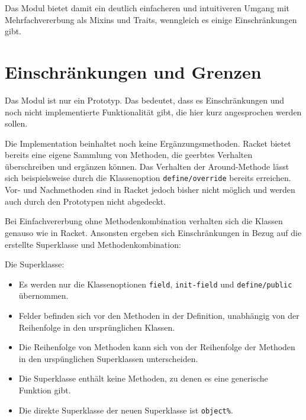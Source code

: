 Das Modul bietet damit ein deutlich einfacheren und intuitiveren Umgang mit Mehrfachvererbung als Mixins und Traits, wenngleich es einige Einschränkungen gibt.

\section{Einschränkungen und Grenzen}
Das Modul ist nur ein Prototyp. Das bedeutet, dass es  Einschränkungen und noch nicht implementierte Funktionalität gibt, die hier kurz angesprochen werden sollen.

Die Implementation beinhaltet noch keine Ergänzungsmethoden. Racket bietet bereits eine eigene Sammlung von Methoden, die geerbtes Verhalten überschreiben und ergänzen können. Das Verhalten der Around-Methode lässt sich beispielsweise durch die Klassenoption \texttt{define/override} bereits erreichen. Vor- und Nachmethoden sind in Racket jedoch bisher nicht möglich und werden auch durch den Prototypen nicht abgedeckt.

Bei Einfachvererbung ohne Methodenkombination verhalten sich die Klassen genauso wie in Racket. Ansonsten ergeben sich Einschränkungen in Bezug auf die erstellte Superklasse und Methodenkombination:

Die Superklasse:
\begin{itemize}
 \item Es werden nur die Klassenoptionen \texttt{field}, \texttt{init-field} und \texttt{define/public} übernommen.
 \item Felder befinden sich vor den Methoden in der Definition, unabhängig von der Reihenfolge in den ursprünglichen Klassen.
 \item Die Reihenfolge von Methoden kann sich von der Reihenfolge der Methoden in den urspünglichen Superklassen unterscheiden.  
 \item Die Superklasse enthält keine Methoden, zu denen es eine generische Funktion gibt.
 \item Die direkte Superklasse der neuen Superklasse ist \texttt{object\%}.
\end{itemize}

